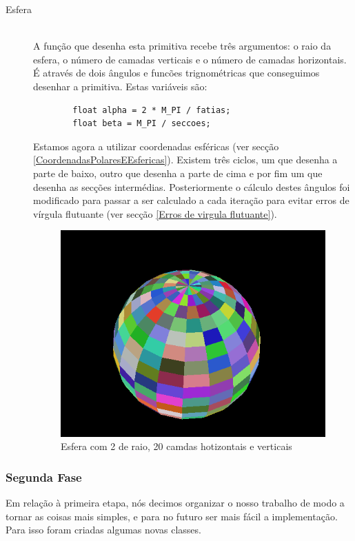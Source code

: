 \documentclass[a5paper,onecolumn, 11pt]{article}
\begin{document}
\begin{description}
	\item[Esfera] \hfill \\
	A função que desenha esta primitiva recebe três argumentos: o raio da esfera, o número de camadas verticais e o número de camadas horizontais. É através de dois ângulos e funcões trignométricas que conseguimos desenhar a primitiva. Estas variáveis são:
	\begin{verbatim}
		float alpha = 2 * M_PI / fatias;
		float beta = M_PI / seccoes;
	\end{verbatim}
	Estamos agora a utilizar coordenadas esféricas (ver secção \ref{CoordenadasPolaresEEsfericas}). Existem três ciclos, um que desenha a parte de baixo, outro que desenha a parte de cima e por fim um que desenha as secções intermédias.
	Posteriormente o cálculo destes ângulos foi modificado para passar a ser calculado a cada iteração para evitar erros de vírgula flutuante (ver secção \ref{Erros de virgula flutuante}).
	\begin{figure}[h!b!t!]
		\centering
		\includegraphics[scale=0.7]{esfera.png}
		\caption{Esfera com 2 de raio, 20 camdas hotizontais e verticais}
	\end{figure}
\end{description}
\clearpage
\subsubsection{Segunda Fase}
Em relação à primeira etapa, nós decimos organizar o nosso trabalho de modo a tornar as coisas mais simples, e para no futuro ser mais fácil a implementação. Para isso foram criadas algumas novas classes.
\end{document}
